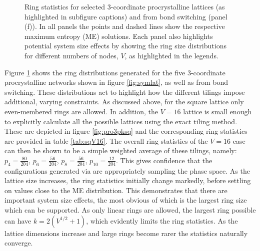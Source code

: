 \begin{figure}[btp]
     \caption{Ring statistics for selected 3\--coordinate procrystalline lattices (as highlighted in subfigure captions) and from bond switching (panel (f)). In  all  panels  the  points  and  dashed  lines show the respective maximum entropy (ME) solutions.  Each panel also highlights potential system size effects by showing the ring size distributions for different numbers of nodes, $V$, as highlighted in the legends.}
     \label{fig:pro3pk}
\end{figure}

Figure \ref{fig:pro3pk} shows the ring distributions generated for the five 3\--coordinate procrystalline networks shown in figure \ref{fig:symlat}, as well as from bond switching.
These distributions act to highlight how the different tilings impose additional, varying constraints.
As discussed above, for the square lattice only even\--membered rings are allowed.
In addition, the $V=16$ lattice is small enough to explicitly calculate all the possible lattices using the exact tiling method.
These are depicted in figure \ref{fig:pro3pksq} and the corresponding ring statistics are provided in table \ref{tab:sqV16}.
The overall ring statistics of the $V=16$ case can then be shown to be a simple weighted average of these tilings, namely: $p_4=\frac{80}{204}$, $p_6=\frac{56}{204}$, $p_8=\frac{56}{204}$, $p_{10}=\frac{12}{204}$.
This gives confidence that the configurations generated via \mc{} are appropriately sampling the phase space.
As the lattice size increases, the ring statistics initially change markedly, before settling on values close to the ME distribution.
This demonstrates that there are important system size effects, the most obvious of which is the largest ring size which can be supported.
As only linear rings are allowed, the largest ring possible can have $k=2\left(V^{1/2}+1\right)$, which evidently limits the ring statistics.
As the lattice dimensions increase and large rings become rarer the statistics naturally converge.

